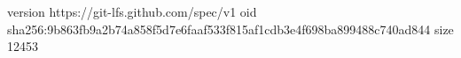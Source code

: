 version https://git-lfs.github.com/spec/v1
oid sha256:9b863fb9a2b74a858f5d7e6faaf533f815af1cdb3e4f698ba899488c740ad844
size 12453
